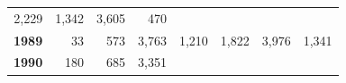 \documentclass[]{article}
\begin{document}
\begin{longtable}[]{@{}rrrrrrrr@{}}
\begin{minipage}[t]{0.14\columnwidth}
2,229\strut
\end{minipage} & \begin{minipage}[t]{0.09\columnwidth}\raggedleft\strut
1,342\strut
\end{minipage} & \begin{minipage}[t]{0.08\columnwidth}\raggedleft\strut
3,605\strut
\end{minipage} & \begin{minipage}[t]{0.10\columnwidth}\raggedleft\strut
470\strut
\end{minipage}\tabularnewline
\begin{minipage}[t]{0.08\columnwidth}\raggedleft\strut
\textbf{1989}\strut
\end{minipage} & \begin{minipage}[t]{0.10\columnwidth}\raggedleft\strut
33\strut
\end{minipage} & \begin{minipage}[t]{0.11\columnwidth}\raggedleft\strut
573\strut
\end{minipage} & \begin{minipage}[t]{0.08\columnwidth}\raggedleft\strut
3,763\strut
\end{minipage} & \begin{minipage}[t]{0.14\columnwidth}\raggedleft\strut
1,210\strut
\end{minipage} & \begin{minipage}[t]{0.09\columnwidth}\raggedleft\strut
1,822\strut
\end{minipage} & \begin{minipage}[t]{0.08\columnwidth}\raggedleft\strut
3,976\strut
\end{minipage} & \begin{minipage}[t]{0.10\columnwidth}\raggedleft\strut
1,341\strut
\end{minipage}\tabularnewline
\begin{minipage}[t]{0.08\columnwidth}\raggedleft\strut
\textbf{1990}\strut
\end{minipage} & \begin{minipage}[t]{0.10\columnwidth}\raggedleft\strut
180\strut
\end{minipage} & \begin{minipage}[t]{0.11\columnwidth}\raggedleft\strut
685\strut
\end{minipage} & \begin{minipage}[t]{0.08\columnwidth}\raggedleft\strut
3,351\strut
\end{minipage} & \begin{minipage}[t]{0.14\columnwidth}\raggedleft\strut

\end{minipage}
\end{longtable}
\end{document}
